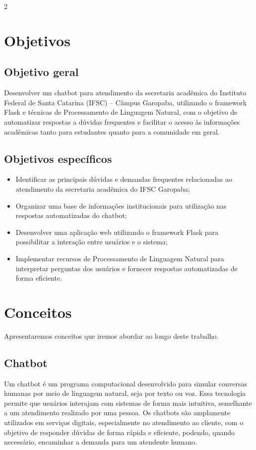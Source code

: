 \documentclass[10pt]{article}
\begin{document}
\begin{multicols}{2}
\section{Objetivos}\label{sec:objetivos}

\subsection{Objetivo geral}

Desenvolver um chatbot para atendimento da secretaria acadêmica do
Instituto Federal de Santa Catarina (IFSC) -- Câmpus Garopaba, utilizando
o framework Flask e técnicas de Processamento de Linguagem Natural, com o
objetivo de automatizar respostas a dúvidas frequentes e facilitar o
acesso às informações acadêmicas tanto para estudantes quanto para a
comunidade em geral.

\subsection{Objetivos específicos}

\begin{itemize}
  \item Identificar as principais dúvidas e demandas frequentes
  relacionadas ao atendimento da secretaria acadêmica do IFSC Garopaba;
  \item Organizar uma base de informações institucionais para utilização
  nas respostas automatizadas do chatbot;
  \item Desenvolver uma aplicação web utilizando o framework Flask para
  possibilitar a interação entre usuários e o sistema;
  \item Implementar recursos de Processamento de Linguagem Natural para
  interpretar perguntas dos usuários e fornecer respostas automatizadas
  de forma eficiente.
\end{itemize}

\section{Conceitos}\label{sec:conceitos}

Apresentaremos conceitos que iremos abordar ao longo deste trabalho.

\subsection{Chatbot}

Um chatbot é um programa computacional desenvolvido para simular
conversas humanas por meio de linguagem natural, seja por texto ou voz.
Essa tecnologia permite que usuários interajam com sistemas de forma mais
intuitiva, semelhante a um atendimento realizado por uma pessoa. Os
chatbots são amplamente utilizados em serviços digitais, especialmente no
atendimento ao cliente, com o objetivo de responder dúvidas de forma
rápida e eficiente, podendo, quando necessário, encaminhar a demanda para
um atendente humano.


\end{multicols}
\end{document}
